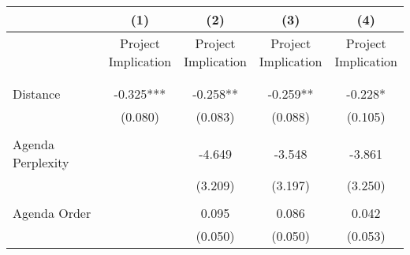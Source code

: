 \begin{tabular}{lcccc}
\toprule
                  &                               (1) &                               (2) &                               (3) &                               (4) \\
\midrule
                  & \makecell{Project \\ Implication} & \makecell{Project \\ Implication} & \makecell{Project \\ Implication} & \makecell{Project \\ Implication} \\
                  &                                   &                                   &                                   &                                   \\
                  &                                   &                                   &                                   &                                   \\
         Distance &                         -0.325*** &                          -0.258** &                          -0.259** &                           -0.228* \\
                  &                           (0.080) &                           (0.083) &                           (0.088) &                           (0.105) \\
                  &                                   &                                   &                                   &                                   \\
Agenda Perplexity &                                   &                            -4.649 &                            -3.548 &                            -3.861 \\
                  &                                   &                           (3.209) &                           (3.197) &                           (3.250) \\
                  &                                   &                                   &                                   &                                   \\
     Agenda Order &                                   &                             0.095 &                             0.086 &                             0.042 \\
                  &                                   &                           (0.050) &                           (0.050) &                           (0.053) \\

\end{tabular}
